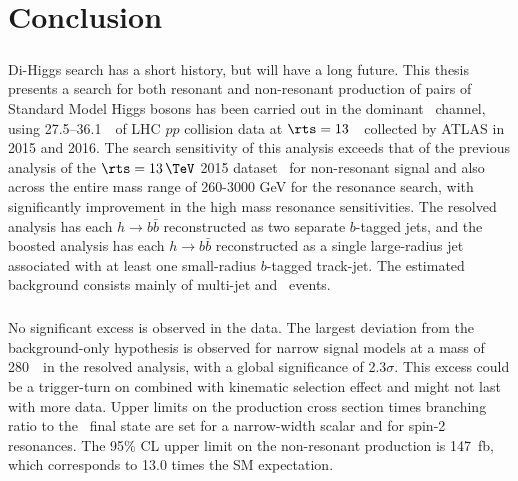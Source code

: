 \chapter{Conclusion}
\label{conclusion}


\paragraph{}
Di-Higgs search has a short history, but will have a long future. This thesis presents a search for both resonant and non-resonant production of pairs of Standard Model Higgs bosons has been carried out in the dominant \fourb\ channel, using 27.5--36.1~\ifb\ of LHC $pp$ collision data at $\rts = 13$~\TeV\ collected by ATLAS in 2015 and 2016. The search sensitivity of this analysis exceeds that of the previous analysis of the $\rts = 13\,\TeV$ 2015 dataset~\cite{Aaboud:2016xco} for non-resonant signal and also across the entire mass range of 260-3000 GeV for the resonance search, with significantly improvement in the high mass resonance sensitivities. The resolved analysis has each $h \to b\bar{b}$ reconstructed as two separate $b$-tagged jets, and the boosted analysis has each $h \to b\bar{b}$ reconstructed as a single large-radius jet associated with at least one small-radius $b$-tagged track-jet. The estimated background consists mainly of multi-jet and \ttbar\ events.

\paragraph{}
No significant excess is observed in the data. The largest deviation from the background-only hypothesis is observed for narrow signal models at a mass of 280~\GeV\ in the resolved analysis, with a global significance of 2.3$\sigma$. This excess could be a trigger-turn on combined with kinematic selection effect and might not last with more data. Upper limits on the production cross section times branching ratio to the \fourb\ final state are set for a narrow-width scalar and for spin-2 resonances. The 95\% CL upper limit on the non-resonant production is 147~fb, which corresponds to 13.0 times the SM expectation. %

